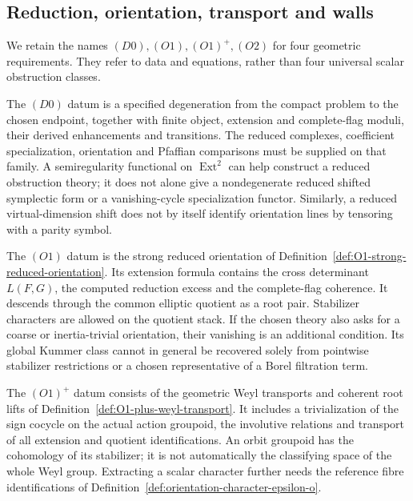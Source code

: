 \subsection{Reduction, orientation, transport and walls}
\label{subsec:ch6-obstructions}

We retain the names \((D0),(O1),(O1)^+,(O2)\) for four geometric
requirements.  They refer to data and equations, rather than four
universal scalar obstruction classes.

The \((D0)\) datum is a specified degeneration from the compact
problem to the chosen endpoint, together with finite object,
extension and complete-flag moduli, their derived enhancements and
transitions.  The reduced complexes, coefficient specialization,
orientation and Pfaffian comparisons must be supplied on that
family.  A semiregularity functional on \(\operatorname{Ext}^2\)
can help construct a reduced obstruction theory; it does not alone
give a nondegenerate reduced shifted symplectic form or a
vanishing-cycle specialization functor.  Similarly, a reduced
virtual-dimension shift does not by itself identify orientation
lines by tensoring with a parity symbol.

The \((O1)\) datum is the strong reduced orientation of
Definition~\ref{def:O1-strong-reduced-orientation}.  Its extension
formula contains the cross determinant \(L(F,G)\), the computed
reduction excess and the complete-flag coherence.  It descends
through the common elliptic quotient as a root pair.  Stabilizer
characters are allowed on the quotient stack.  If the chosen theory
also asks for a coarse or inertia-trivial orientation, their
vanishing is an additional condition.  Its global Kummer class
cannot in general be recovered solely from pointwise stabilizer
restrictions or a chosen representative of a Borel filtration term.

The \((O1)^+\) datum consists of the geometric Weyl transports
and coherent root lifts of Definition~\ref{def:O1-plus-weyl-transport}.
It includes a trivialization of the sign cocycle on the actual
action groupoid, the involutive relations and transport of all
extension and quotient identifications.  An orbit groupoid has the
cohomology of its stabilizer; it is not automatically the
classifying space of the whole Weyl group.  Extracting a scalar
character further needs the reference fibre identifications of
Definition~\ref{def:orientation-character-epsilon-o}.

